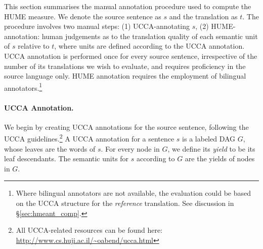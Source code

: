 \documentclass[11pt,letterpaper]{article}
\newcommand{\secref}[1]{\S\ref{#1}}
\begin{document}
This section summarises the manual annotation procedure used
to compute the HUME measure. 
We denote the source sentence as $s$ and the translation as $t$. 
The procedure involves two manual steps: (1) UCCA-annotating $s$, 
(2) HUME-annotation: human judgements as to the translation quality of each semantic
unit of $s$ relative to $t$,
where units are defined according to the UCCA annotation.
UCCA annotation is performed once for every source sentence,
irrespective of the number of its translations we wish to evaluate,
and requires proficiency in the source language only.
HUME annotation requires the employment of bilingual
annotators.\footnote{Where bilingual annotators are not available,
  the evaluation could be based on the UCCA structure for the
  \emph{reference} translation. See discussion in \secref{sec:hmeant_comp}.}


\paragraph{UCCA Annotation.}
We begin by creating UCCA annotations for the source sentence, following the
UCCA guidelines.\footnote{All UCCA-related resources can be found
  here: \url{http://www.cs.huji.ac.il/~oabend/ucca.html}}
A UCCA annotation for a sentence $s$ is a labeled DAG $G$, whose leaves
are the words of $s$.
For every node in $G$, we define its {\it yield} to be its leaf descendants.
The semantic units for $s$ according to $G$ are the yields of nodes in $G$. 

\end{document}
